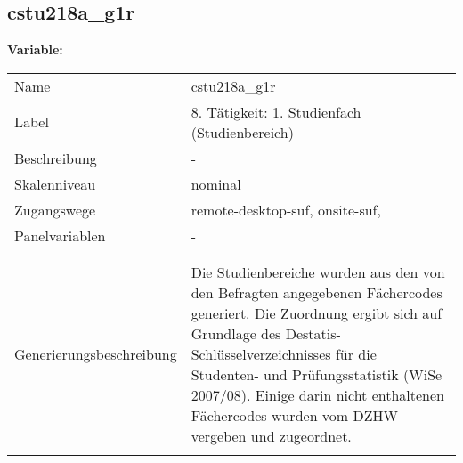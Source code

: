 	
	
	\subsection{cstu218a\_g1r}
	\label{subSection:cstu218a_g1r}

	\noindent\textbf{Variable:}\\
		\begin{tabular}{lL{11.3cm}}
			\label{tableVariable:cstu218a_g1r}
			Name & cstu218a\_g1r \\
			Label & 8. Tätigkeit: 1. Studienfach (Studienbereich) \\
			Beschreibung & - \\
			Skalenniveau & nominal \\
			Zugangswege &
				remote-desktop-suf,
				onsite-suf,
 \\
			Panelvariablen & -
			 \\
			 \\
 \\
					Generierungsbeschreibung & Die Studienbereiche wurden aus den von den Befragten angegebenen Fächercodes generiert. Die Zuordnung ergibt sich auf Grundlage des Destatis-Schlüsselverzeichnisses für die Studenten- und Prüfungsstatistik (WiSe 2007/08). Einige darin nicht enthaltenen Fächercodes wurden vom DZHW vergeben und zugeordnet. 
				 \\	
			 \\
		\end{tabular}







